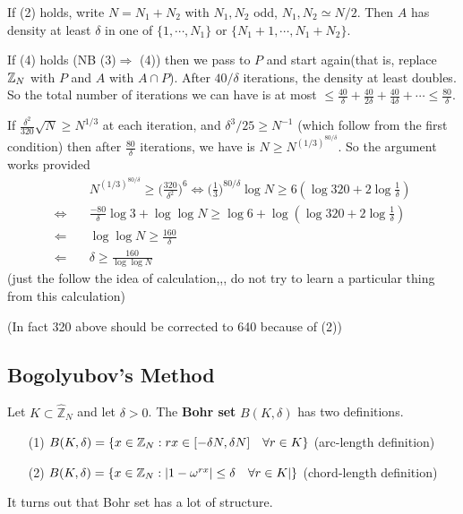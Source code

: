 \documentclass[10pt,a4paper]{report}
\renewcommand{\hat}{\widehat}
\begin{document}
\quad If (2) holds, write $N=N_1+N_2$ with $N_1, N_2$ odd, $N_1, N_2 \simeq N/2$. Then $A$ has density at least $\delta$ in one of $\{1,\cdots, N_1\}$ or $\{N_1 +1, \cdots, N_1 + N_2\}$.

\quad If (4) holds (NB (3)$\Rightarrow$ (4)) then we pass to $P$ and start again(that is, replace $\mathbb{Z}_N$ with $P$ and $A$ with $A\cap P$). After $40/\delta$ iterations, the density at least doubles. So the total number of iterations we can have is at most $\leq \frac{40}{\delta} + \frac{40}{2\delta} + \frac{40}{4\delta} + \cdots \leq \frac{80}{\delta}$.

\quad If $\frac{\delta^2}{320} \sqrt{N} \geq N^{1/3}$ at each iteration, and $\delta^3/25 \geq N^{-1}$ (which follow from the first condition) then after $\frac{80}{\delta}$ iterations, we have is $N\geq N^{(1/3)^{80/\delta}}$. So the argument works provided
\begin{align*}
&N^{(1/3)^{80/\delta}} \geq \Big( \frac{320}{\delta^2} \Big)^6 \Leftrightarrow \Big( \frac{1}{3} \Big)^{80/\delta} \log N \geq 6(\log 320 + 2\log \frac{1}{\delta}) \\
\Leftrightarrow \quad & \frac{-80}{\delta} \log 3 + \log \log N \geq \log 6 + \log (\log 320 + 2\log \frac{1}{\delta}) \\
\Leftarrow \quad &\log \log N \geq \frac{160}{\delta} \\
\Leftarrow \quad &\delta\geq \frac{160}{\log \log N}
\end{align*}
(just the follow the idea of calculation,,, do not try to learn a particular thing from this calculation)

(In fact 320 above should be corrected to 640 because of (2))
\s

\subsection*{Bogolyubov's Method}

 Let $K \subset \hat{\mathbb{Z}}_N$ and let $\delta >0$. The \textbf{Bohr set} $B(K,\delta)$ has two definitions.
\begin{itemize}
\item[(1)] $B(K,\delta) = \{x\in \mathbb{Z}_N : rx \in [-\delta N, \delta N] \quad \forall r\in K \}$ (arc-length definition)
\item[(2)] $B(K,\delta) = \{x\in \mathbb{Z}_N : |1- \omega^{rx}| \leq \delta \quad \forall r\in K|\}$ (chord-length definition)
\end{itemize}
\s

It turns out that Bohr set has a lot of structure.
\s
\end{document}
